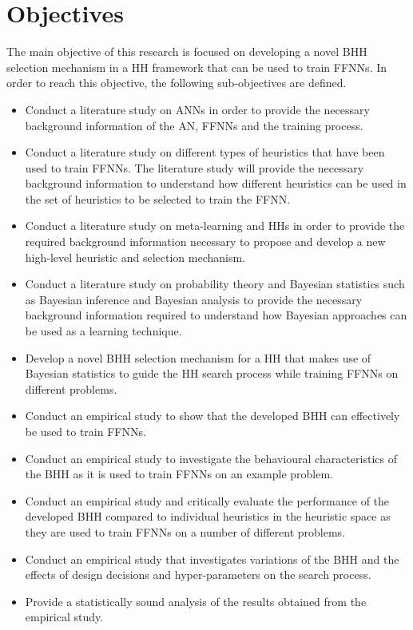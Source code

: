 \section{Objectives}\label{sec:introduction:objectives}

The main objective of this research is focused on developing a novel \Acf{BHH} selection mechanism in a \acs{HH} framework that can be used to train \acp{FFNN}. In order to reach this objective, the following sub-objectives are defined.

\begin{itemize}
      \item Conduct a literature study on \acp{ANN} in order to provide the necessary background information of the \acs{AN}, \acp{FFNN} and the training process.

      \item Conduct a literature study on different types of heuristics that have been used to train \acp{FFNN}. The literature study will provide the necessary background information to understand how different heuristics can be used in the set of heuristics to be selected to train the \acs{FFNN}.

      \item Conduct a literature study on meta-learning and \acp{HH} in order to provide the required background information necessary to propose and develop a new high-level heuristic and selection mechanism.

      \item Conduct a literature study on probability theory and Bayesian statistics such as Bayesian inference and Bayesian analysis to provide the necessary background information required to understand how Bayesian approaches can be used as a learning technique.

      \item Develop a novel \Acs{BHH} selection mechanism for a \acs{HH} that makes use of Bayesian statistics to guide the \acs{HH} search process while training \acp{FFNN} on different problems.

      \item Conduct an empirical study to show that the developed \Acs{BHH} can effectively be used to train \acp{FFNN}.

      \item Conduct an empirical study to investigate the behavioural characteristics of the \Acs{BHH} as it is used to train \acp{FFNN} on an example problem.

      \item Conduct an empirical study and critically evaluate the performance of the developed \Acs{BHH} compared to individual heuristics in the heuristic space as they are used to train \acp{FFNN} on a number of different problems.

      \item Conduct an empirical study that investigates variations of the \Acs{BHH} and the effects of design decisions and hyper-parameters on the search process.

      \item Provide a statistically sound analysis of the results obtained from the empirical study.
\end{itemize}

